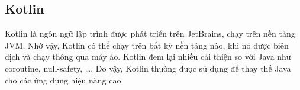 \documentclass[./../main.tex]{subfiles}
\begin{document}
\subsection{Kotlin}

Kotlin là ngôn ngữ lập trình được phát triển trên JetBrains, chạy trên nền tảng JVM. Nhờ vậy, Kotlin có thể chạy trên bất kỳ nền tảng nào, khi nó được biên dịch và chạy thông qua máy ảo. Kotlin đem lại nhiều cải thiện so với Java như coroutine, null-safety, \ldots{}. Do vậy, Kotlin thường được sử dụng để thay thế Java cho các ứng dụng hiệu năng cao.
\end{document}
